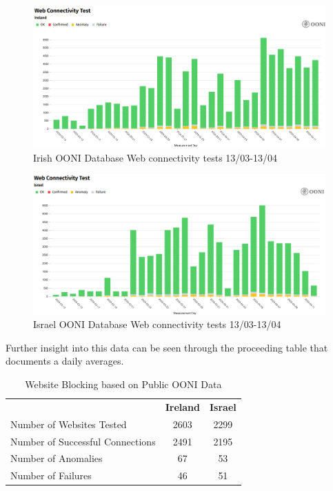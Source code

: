 \begin{figure} [H]
    \centering
    \includegraphics[width=1\linewidth]{IREWEBSOONIDB.png}
    \caption{Irish OONI Database Web connectivity tests 13/03-13/04}
    \label{fig:enter-label}
\end{figure}

\begin{figure} [H]
    \centering
    \includegraphics[width=1\linewidth]{ISRWEBSOONIDB.png}
    \caption{Israel OONI Database Web connectivity tests 13/03-13/04}
    \label{fig:enter-label}
\end{figure}

Further insight into this data can be seen through the proceeding table that documents a daily averages. 

\begin{table} [H]
\centering
\caption{Website Blocking based on Public OONI Data}
\begin{tabular}{lcc}
\toprule
\textbf{} & \textbf{Ireland} & \textbf{Israel} \\
Number of Websites Tested           & 2603 &  2299 \\
Number of Successful Connections    & 2491 & 2195 \\
Number of Anomalies                 & 67 & 53 \\
Number of Failures                  & 46 & 51 \\
\bottomrule
\end{tabular}
\label{tab:category_block}
\end{table}

